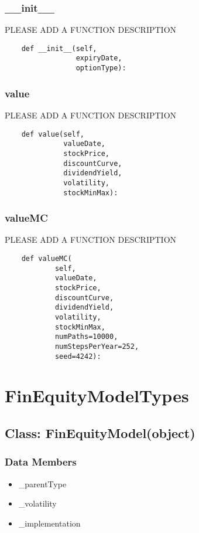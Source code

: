 \documentclass[twoside,11pt]{book}
\begin{document}
\subsubsection*{{\bf \_\_init\_\_}}
PLEASE ADD A FUNCTION DESCRIPTION

\begin{lstlisting}
    def __init__(self,
                 expiryDate,
                 optionType):
\end{lstlisting}

\subsubsection*{{\bf value}}
PLEASE ADD A FUNCTION DESCRIPTION

\begin{lstlisting}
    def value(self,
              valueDate,
              stockPrice,
              discountCurve,
              dividendYield,
              volatility,
              stockMinMax):
\end{lstlisting}

\subsubsection*{{\bf valueMC}}
PLEASE ADD A FUNCTION DESCRIPTION

\begin{lstlisting}
    def valueMC(
            self,
            valueDate,
            stockPrice,
            discountCurve,
            dividendYield,
            volatility,
            stockMinMax,
            numPaths=10000,
            numStepsPerYear=252,
            seed=4242):
\end{lstlisting}

\newpage
\section{FinEquityModelTypes}

\subsection*{Class: FinEquityModel(object)}


\subsubsection*{Data Members}
\begin{itemize}
\item{\_parentType}
\item{\_volatility}
\item{\_implementation}
\end{itemize}
\end{document}
